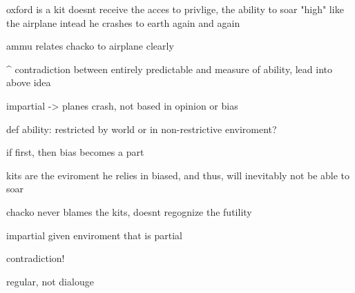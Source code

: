 \documentclass[letterpaper]{article}
\begin{document}
oxford is a kit doesnt receive the acces to privlige, the ability to
soar "high" like the airplane intead he crashes to earth again and again

ammu relates chacko to airplane clearly

\^{} contradiction between entirely predictable and measure of ability,
lead into above idea

impartial -> planes crash, not based in opinion or bias

def ability: restricted by world or in non-restrictive enviroment?

if first, then bias becomes a part

kits are the eviroment he relies in biased, and thus, will inevitably
not be able to soar

chacko never blames the kits, doesnt regognize the futility

impartial given enviroment that is partial

contradiction!

regular, not dialouge
\end{document}
